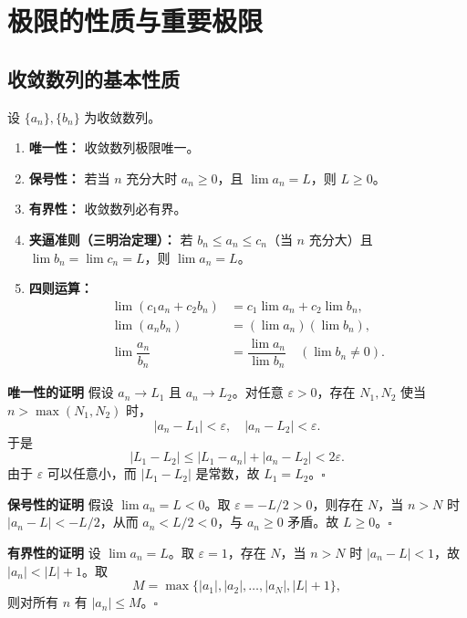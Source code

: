 \documentclass{ctexart}
\newenvironment{custom}[1]{\par\noindent \textbf{#1}\quad}{\par\vspace{1em}}
\begin{document}
\clearpage
\section{极限的性质与重要极限}

\subsection{收敛数列的基本性质}

\begin{theorem}[极限的性质]
设 \(\{a_n\}, \{b_n\}\) 为收敛数列。
\begin{enumerate}
\item \textbf{唯一性：} 收敛数列极限唯一。
\item \textbf{保号性：} 若当 \(n\) 充分大时 \(a_n \geq 0\)，且 \(\lim a_n = L\)，则 \(L \geq 0\)。
\item \textbf{有界性：} 收敛数列必有界。
\item \textbf{夹逼准则（三明治定理）：} 若 \(b_n \leq a_n \leq c_n\)（当 \(n\) 充分大）且 \(\lim b_n = \lim c_n = L\)，则 \(\lim a_n = L\)。
\item \textbf{四则运算：}
   \begin{align*}
   \lim (c_1 a_n + c_2 b_n) &= c_1 \lim a_n + c_2 \lim b_n,\\
   \lim (a_n b_n) &= (\lim a_n)(\lim b_n),\\
   \lim \dfrac{a_n}{b_n} &= \dfrac{\lim a_n}{\lim b_n} \quad (\lim b_n \neq 0).
   \end{align*}
\end{enumerate}
\end{theorem}

\begin{custom}{唯一性的证明}
假设 \(a_n \to L_1\) 且 \(a_n \to L_2\)。对任意 \(\varepsilon > 0\)，存在 \(N_1, N_2\) 使当 \(n > \max(N_1, N_2)\) 时，
\[
|a_n - L_1| < \varepsilon,\quad |a_n - L_2| < \varepsilon.
\]
于是
\[
|L_1 - L_2| \leq |L_1 - a_n| + |a_n - L_2| < 2\varepsilon.
\]
由于 \(\varepsilon\) 可以任意小，而 \(|L_1 - L_2|\) 是常数，故 \(L_1 = L_2\)。\(\square\)
\end{custom}

\begin{custom}{保号性的证明}
假设 \(\lim a_n = L < 0\)。取 \(\varepsilon = -L/2 > 0\)，则存在 \(N\)，当 \(n > N\) 时 \(|a_n - L| < -L/2\)，从而 \(a_n < L/2 < 0\)，与 \(a_n \geq 0\) 矛盾。故 \(L \geq 0\)。\(\square\)
\end{custom}

\begin{custom}{有界性的证明}
设 \(\lim a_n = L\)。取 \(\varepsilon = 1\)，存在 \(N\)，当 \(n > N\) 时 \(|a_n - L| < 1\)，故 \(|a_n| < |L| + 1\)。取
\[
M = \max\{|a_1|, |a_2|, \dots, |a_N|, |L|+1\},
\]
则对所有 \(n\) 有 \(|a_n| \leq M\)。\(\square\)
\end{custom}
\end{document}
